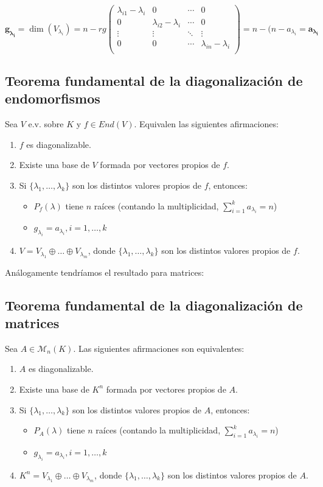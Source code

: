 \documentclass[x11names,table]{report}
\begin{document}
\[\mathbf{g_{\lambda_i}}=\dim(V_{\lambda_i})=n-rg
\begin{pmatrix}
\lambda_{i1}-\lambda_i&0&\cdots&0\\
0&\lambda_{i2}-\lambda_i&\cdots&0\\
\vdots&\vdots&\ddots&\vdots\\
0&0&\cdots&\lambda_{in}-\lambda_i\\
\end{pmatrix}=n-(n-a_{\lambda_i}=\mathbf{a_{\lambda_i}}
\]

\subsection{Teorema fundamental de la diagonalización de endomorfismos}

Sea $V$ e.v. sobre $K$ y $f\in End(V)$. Equivalen las siguientes afirmaciones:
\begin{enumerate}
\renewcommand{\labelenumi}{\roman{enumi})}
\item $f$ es diagonalizable.
\item Existe una base de $V$ formada por vectores propios de $f$.
\item Si  $\{\lambda_1,\dots,\lambda_k\}$ son los distintos valores propios de $f$, entonces:
\begin{itemize}
\item $P_f(\lambda)$ tiene $n$ raíces (contando la multiplicidad, $\sum_{i=1}^k a_{\lambda_i}=n$)
\item $g_{\lambda_i}=a_{\lambda_i}, i=1,\dots,k$
\end{itemize}
\item $V=V_{\lambda_1}\oplus\dots\oplus V_{\lambda_m}$, donde $\{\lambda_1,\dots,\lambda_k\}$ son los distintos valores propios de $f$.
\end{enumerate}
Análogamente tendríamos el resultado para matrices:

\subsection{Teorema fundamental de la diagonalización de matrices}

Sea $A\in \mathcal{M}_n(K)$. Las siguientes afirmaciones son equivalentes:
\begin{enumerate}
\renewcommand{\labelenumi}{\roman{enumi})}
\item $A$ es diagonalizable.
\item Existe una base de $K^n$ formada por vectores propios de $A$.
\item Si  $\{\lambda_1,\dots,\lambda_k\}$ son los distintos valores propios de $A$, entonces:
\begin{itemize}
\item $P_A(\lambda)$ tiene $n$ raíces (contando la multiplicidad, $\sum_{i=1}^k a_{\lambda_i}=n$)
\item $g_{\lambda_i}=a_{\lambda_i}, i=1,\dots,k$
\end{itemize}
\item $K^n=V_{\lambda_1}\oplus\dots\oplus V_{\lambda_m}$, donde $\{\lambda_1,\dots,\lambda_k\}$ son los distintos valores propios de $A$.
\end{enumerate}
\end{document}
